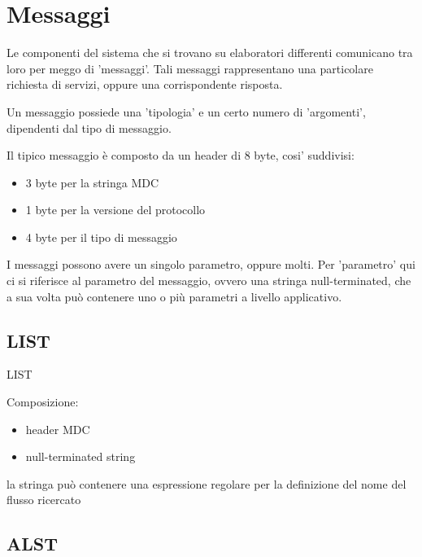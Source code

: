 \section{Messaggi}


Le componenti del sistema che si trovano su elaboratori differenti comunicano tra loro per meggo di 'messaggi'. Tali messaggi rappresentano una particolare richiesta di servizi, oppure una corrispondente risposta.

Un messaggio possiede una 'tipologia' e un certo numero di 'argomenti', dipendenti dal tipo di messaggio.

Il tipico messaggio è composto da un header di 8 byte, cosi' suddivisi:



\begin{itemize}
\item 3 byte per la stringa MDC

\item 1 byte per la versione del protocollo

\item 4 byte per il tipo di messaggio
\end{itemize}

I messaggi possono avere un singolo parametro, oppure molti. Per 'parametro' qui ci si riferisce al parametro del messaggio, ovvero una stringa null-terminated, che a sua volta può contenere uno o più parametri a livello applicativo.






\subsection{LIST}
%

LIST



Composizione:



\begin{itemize}
\item header MDC

\item null-terminated string
\end{itemize}

la stringa può contenere una espressione regolare per la definizione del nome del flusso ricercato






\subsection{ALST}
%

